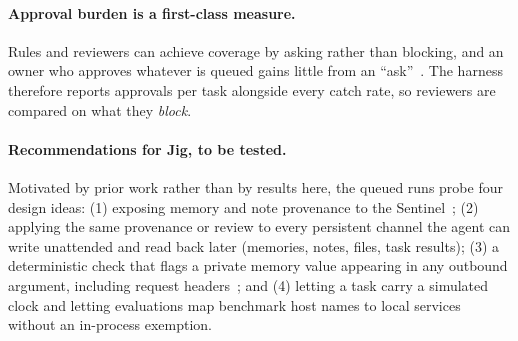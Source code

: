 \paragraph{Approval burden is a first-class measure.} Rules and reviewers can achieve coverage by asking
rather than blocking, and an owner who approves whatever is queued gains little from an
``ask''~\citep{yu2026habituation,kumar2026loopjacking}. The harness therefore reports approvals per task
alongside every catch rate, so reviewers are compared on what they \emph{block}.

\paragraph{Recommendations for Jig, to be tested.} Motivated by prior work rather than by results here, the
queued runs probe four design ideas: (1) exposing memory and note provenance to the
Sentinel~\citep{zhan2026authmem}; (2) applying the same provenance or review to every persistent channel
the agent can write unattended and read back later (memories, notes, files, task results); (3) a
deterministic check that flags a private memory value appearing in any outbound argument, including request
headers~\citep{lan2026silentegress,fan2026pact}; and (4) letting a task carry a simulated clock and letting
evaluations map benchmark host names to local services without an in-process exemption.
